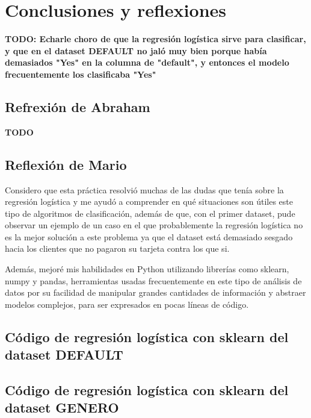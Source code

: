 \documentclass[sigconf,authorversion,nonacm]{acmart}
\begin{document}
\section{Conclusiones y reflexiones}
\textbf{TODO: Echarle choro de que la regresión logística sirve para clasificar, y que en el dataset DEFAULT no jaló muy bien porque había demasiados "Yes" en la columna de "default", y entonces el modelo frecuentemente los clasificaba "Yes"}

\subsection{Refrexión de Abraham}
\textbf{TODO}

\subsection{Reflexión de Mario}
Considero que esta práctica resolvió muchas de las dudas que tenía sobre la regresión logística y me ayudó a comprender en qué situaciones son útiles este tipo de algoritmos de clasificación, además de que, con el primer dataset, pude observar un ejemplo de un caso en el que probablemente la regresión logística no es la mejor solución a este problema ya que el dataset está demasiado sesgado hacia los clientes que no pagaron su tarjeta contra los que si.

Además, mejoré mis habilidades en Python utilizando librerías como sklearn, numpy y pandas, herramientas usadas frecuentemente en este tipo de análisis de datos por su facilidad de manipular grandes cantidades de información y abstraer modelos complejos, para ser expresados en pocas líneas de código.





\clearpage

\appendix

\lstset{style=customstyle}

\begin{figure*}
  \section{Código de regresión logística con sklearn del dataset DEFAULT}
  
\end{figure*}

\begin{figure*}
  \section{Código de regresión logística con sklearn del dataset GENERO}
  
\end{figure*}
\end{document}
